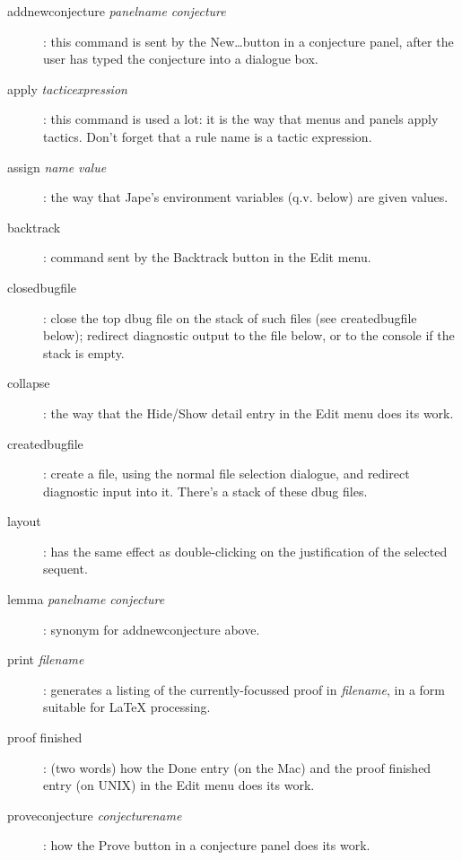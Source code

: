 \begin{description}
\item[addnewconjecture \textit{panelname} \textit{conjecture}]: this command is sent by the New\dots  button in a conjecture panel, after the user has typed the conjecture into a dialogue box.

\item[apply \textit{tacticexpression}]: this command is used a lot: it is the way that menus and panels apply tactics. Don't forget that a rule name is a tactic expression.


\item[assign \textit{name} \textit{value}]: the way that Jape's environment variables (q.v. below) are given values.


\item[backtrack]: command sent by the Backtrack button in the Edit menu.


\item[closedbugfile]: close the top dbug file on the stack of such files (see createdbugfile below); redirect diagnostic output to the file below, or to the console if the stack is empty.


\item[collapse]: the way that the Hide/Show detail entry in the Edit menu does its work.


\item[createdbugfile]: create a file, using the normal file selection dialogue, and redirect diagnostic input into it. There's a stack of these dbug files.


\item[layout]: has the same effect as double-clicking on the justification of the selected sequent.

\item[lemma \textit{panelname} \textit{conjecture}]: synonym for addnewconjecture above.


\item[print \textit{filename}]: generates a listing of the currently-focussed proof in \textit{filename}, in a form suitable for LaTeX processing.

\item[proof finished]: (two words) how the Done entry (on the Mac) and the proof finished entry (on UNIX) in the Edit menu does its work.


\item[proveconjecture \textit{conjecturename}]: how the Prove button in a conjecture panel does its work.


\end{description}
